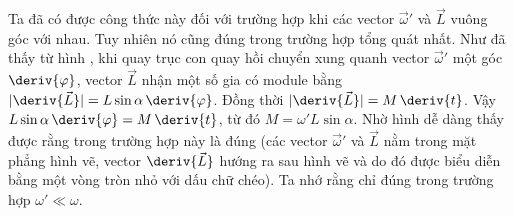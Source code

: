 \noindent
Ta đã có được công thức này đối với trường hợp khi các vector $\vec{\omega}'$ và $\vec{L}$ vuông góc với nhau. Tuy nhiên nó cũng đúng trong trường hợp tổng quát nhất. Như đã thấy từ hình , khi quay trục con quay hồi chuyển xung quanh vector $\vec{\omega}'$ một góc $\deriv{\varphi}$, vector $\vec{L}$ nhận một số gia có module bằng $|\deriv{\vec{L}}|=L\sin\alpha\,\deriv{\varphi}$. Đồng thời $|\deriv{\vec{L}}|=M\,\deriv{t}$. Vậy $L\sin\alpha\,\deriv{\varphi}=M\,\deriv{t}$, từ đó $M=\omega'L\sin\alpha$. Nhờ hình  dễ dàng thấy được rằng  trong trường hợp này là đúng (các vector $\vec{\omega}'$ và $\vec{L}$ nằm trong mặt phẳng hình vẽ, vector $\deriv{\vec{L}}$ hướng ra sau hình vẽ và do đó được biểu diễn bằng một vòng tròn nhỏ với dấu chữ chéo). Ta nhớ rằng  chỉ đúng trong trường hợp $\omega'\ll\omega$.

